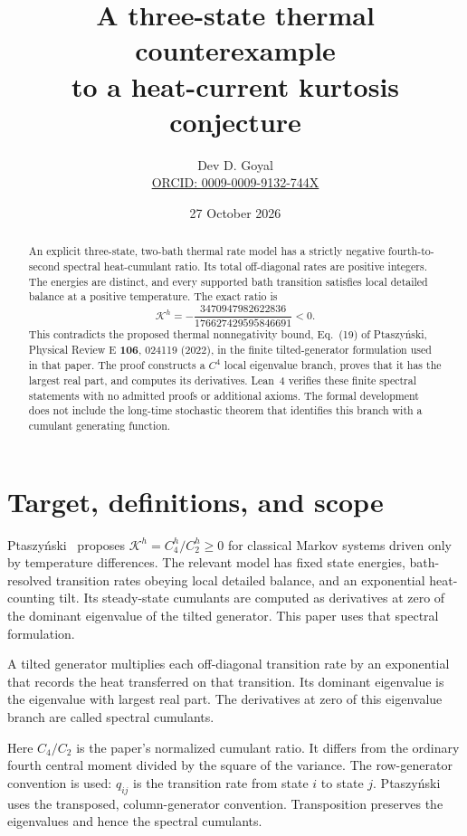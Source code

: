 \documentclass[11pt,a4paper]{article}
\title{\color{navy}A three-state thermal counterexample\protect\\to a heat-current kurtosis conjecture}
\author{Dev D. Goyal\\[3pt]\small\href{https://orcid.org/0009-0009-9132-744X}{ORCID: 0009-0009-9132-744X}}
\date{27 October 2026}
\newcommand{\K}{\mathcal K}
\begin{document}
\maketitle
\begin{abstract}
An explicit three-state, two-bath thermal rate model has a strictly negative fourth-to-second spectral heat-cumulant ratio. Its total off-diagonal rates are positive integers. The energies are distinct, and every supported bath transition satisfies local detailed balance at a positive temperature. The exact ratio is
\[
\K^h=-\frac{3470947982622836}{176627429595846691}<0.
\]
This contradicts the proposed thermal nonnegativity bound, Eq.~(19) of Ptaszy\'nski, Physical Review E \textbf{106}, 024119 (2022), in the finite tilted-generator formulation used in that paper. The proof constructs a $C^4$ local eigenvalue branch, proves that it has the largest real part, and computes its derivatives. Lean~4 verifies these finite spectral statements with no admitted proofs or additional axioms. The formal development does not include the long-time stochastic theorem that identifies this branch with a cumulant generating function.
\end{abstract}

\section{Target, definitions, and scope}
Ptaszy\'nski~\cite{ptaszynski2022} proposes $\K^h=C_4^h/C_2^h\geq0$ for classical Markov systems driven only by temperature differences. The relevant model has fixed state energies, bath-resolved transition rates obeying local detailed balance, and an exponential heat-counting tilt. Its steady-state cumulants are computed as derivatives at zero of the dominant eigenvalue of the tilted generator. This paper uses that spectral formulation.

A tilted generator multiplies each off-diagonal transition rate by an exponential that records the heat transferred on that transition. Its dominant eigenvalue is the eigenvalue with largest real part. The derivatives at zero of this eigenvalue branch are called spectral cumulants.

Here $C_4/C_2$ is the paper's normalized cumulant ratio. It differs from the ordinary fourth central moment divided by the square of the variance. The row-generator convention is used: $q_{ij}$ is the transition rate from state $i$ to state $j$. Ptaszy\'nski uses the transposed, column-generator convention. Transposition preserves the eigenvalues and hence the spectral cumulants.
\end{document}

